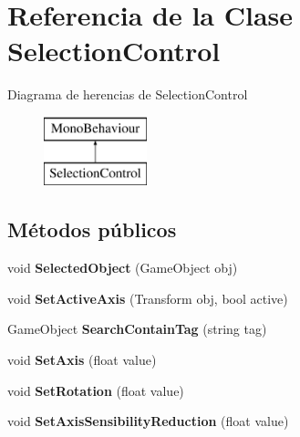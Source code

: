 \hypertarget{class_selection_control}{}\section{Referencia de la Clase Selection\+Control}
\label{class_selection_control}
Diagrama de herencias de Selection\+Control\begin{figure}[H]
\begin{center}
\leavevmode
\includegraphics[height=2.000000cm]{class_selection_control}
\end{center}
\end{figure}
\subsection*{Métodos públicos}
\begin{DoxyCompactItemize}
\item 
\mbox{\label{class_selection_control_a3da021bd2d11255eadadc832b40e6fb6}} 
void {\bfseries Selected\+Object} (Game\+Object obj)
\item 
\mbox{\label{class_selection_control_af45a0f8f9cf7f200e423971f190d8bbf}} 
void {\bfseries Set\+Active\+Axis} (Transform obj, bool active)
\item 
\mbox{\label{class_selection_control_a8e92014a9781e84be7079f4dfd96caf9}} 
Game\+Object {\bfseries Search\+Contain\+Tag} (string tag)
\item 
\mbox{\label{class_selection_control_a5d456be16e3132ae65d37f866ee009f3}} 
void {\bfseries Set\+Axis} (float value)
\item 
\mbox{\label{class_selection_control_ae30e28c63db233cb7a7b9d71174c2846}} 
void {\bfseries Set\+Rotation} (float value)
\item 
\mbox{\label{class_selection_control_ab62778748bb69e20a9fd3318a3083853}} 
void {\bfseries Set\+Axis\+Sensibility\+Reduction} (float value)
\end{DoxyCompactItemize}
